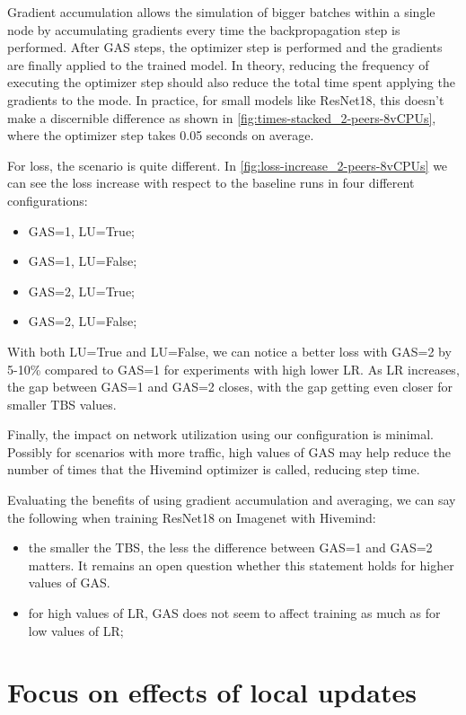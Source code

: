 Gradient accumulation allows the simulation of bigger batches within a single node by accumulating gradients every time the backpropagation step is performed.
After GAS steps, the optimizer step is performed and the gradients are finally applied to the trained model.
In theory, reducing the frequency of executing the optimizer step should also reduce the total time spent applying the gradients to the mode.
In practice, for small models like ResNet18, this doesn't make a discernible difference as shown in \autoref{fig:times-stacked_2-peers-8vCPUs}, where the optimizer step takes 0.05 seconds on average.

For loss, the scenario is quite different.
In \autoref{fig:loss-increase_2-peers-8vCPUs} we can see the loss increase with respect to the baseline runs in four different configurations:
\begin{itemize}
    \item GAS=1, LU=True; 
    \item GAS=1, LU=False;
    \item GAS=2, LU=True;
    \item GAS=2, LU=False;
\end{itemize}

With both LU=True and LU=False, we can notice a better loss with GAS=2 by 5-10\% compared to GAS=1 for experiments with high lower LR.
As LR increases, the gap between GAS=1 and GAS=2 closes, with the gap getting even closer for smaller TBS values.

Finally, the impact on network utilization using our configuration is minimal.
Possibly for scenarios with more traffic, high values of GAS may help reduce the number of times that the Hivemind optimizer is called, reducing step time.

Evaluating the benefits of using gradient accumulation and averaging, we can say the following when training ResNet18 on Imagenet with Hivemind:
\begin{itemize}
    \item the smaller the TBS, the less the difference between GAS=1 and GAS=2 matters. It remains an open question whether this statement holds for higher values of GAS.
    \item for high values of LR, GAS does not seem to affect training as much as for low values of LR;
\end{itemize}

\section{Focus on effects of local updates}


